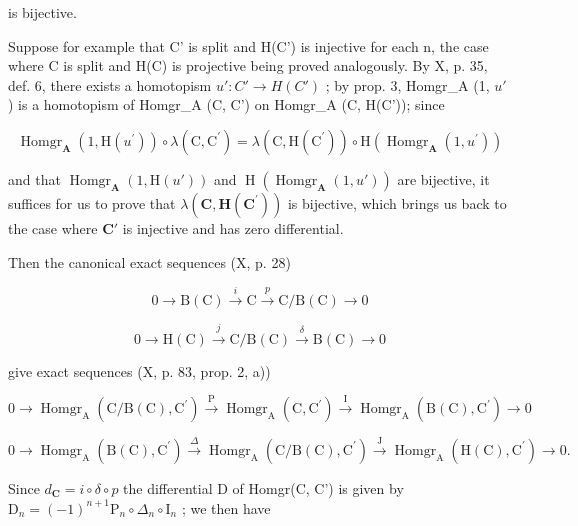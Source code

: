 is bijective.

Suppose for example that C' is split and H(C') is injective for each n, the case where C is split and H(C) is projective being proved analogously. By X, p. 35, def. 6, there exists a homotopism \(u': C' \to H(C')\) ; by prop. 3, Homgr\_A (1, \(u'\) ) is a homotopism of Homgr\_A (C, C') on Homgr\_A (C, H(C')); since

\[
\operatorname{Homgr} _ {\mathbf {A}} \left(1, \mathrm{H} \left(u ^ {\prime}\right)\right) \circ \lambda (\mathrm{C}, \mathrm{C} ^ {\prime}) = \lambda (\mathrm{C}, \mathrm{H} \left(\mathrm{C} ^ {\prime}\right)) \circ \mathrm{H} \left(\operatorname{Homgr} _ {\mathbf {A}} \left(1, u ^ {\prime}\right)\right)
\]

and that \(\operatorname{Homgr}_{\mathbf{A}}(1, \mathrm{H}(u'))\) and \(\operatorname{H}(\operatorname{Homgr}_{\mathbf{A}}(1, u'))\) are bijective, it suffices for us to prove that \(\lambda(\mathbf{C},\mathbf{H}(\mathbf{C}^{\prime}))\) is bijective, which brings us back to the case where \(\mathbf{C}'\) is injective and has zero differential.

Then the canonical exact sequences (X, p. 28)

\[
0 \rightarrow \mathrm{B} (\mathrm{C}) \xrightarrow {i} \mathrm{C} \xrightarrow {p} \mathrm{C} / \mathrm{B} (\mathrm{C}) \rightarrow 0\tag{III}
\]

\[
0 \rightarrow \mathrm{H} (\mathrm{C}) \stackrel {{j}} {{\rightarrow}} \mathrm{C} / \mathrm{B} (\mathrm{C}) \stackrel {{\delta}} {{\rightarrow}} \mathrm{B} (\mathrm{C}) \rightarrow 0\tag{IV}
\]

give exact sequences (X, p. 83, prop. 2, a))

\[
0 \rightarrow \operatorname{Homgr} _ {\mathrm{A}} (\mathrm{C} / \mathrm{B} (\mathrm{C}), \mathrm{C} ^ {\prime}) \xrightarrow {\mathrm{P}} \operatorname{Homgr} _ {\mathrm{A}} (\mathrm{C}, \mathrm{C} ^ {\prime}) \xrightarrow {\mathrm{I}} \operatorname{Homgr} _ {\mathrm{A}} (\mathrm{B} (\mathrm{C}), \mathrm{C} ^ {\prime}) \rightarrow 0
\]

\[
0 \rightarrow \operatorname{Homgr} _ {\mathrm{A}} (\mathrm{B} (\mathrm{C}), \mathrm{C} ^ {\prime}) \stackrel {{\Delta}} {{\rightarrow}} \operatorname{Homgr} _ {\mathrm{A}} (\mathrm{C} / \mathrm{B} (\mathrm{C}), \mathrm{C} ^ {\prime}) \stackrel {{\mathrm{J}}} {{\rightarrow}} \operatorname{Homgr} _ {\mathrm{A}} (\mathrm{H} (\mathrm{C}), \mathrm{C} ^ {\prime}) \rightarrow 0.
\]

Since \(d_{\mathbf{C}} = i \circ \delta \circ p\) the differential D of Homgr(C, C') is given by \(\mathrm{D}_{n} = (-1)^{n+1} \mathrm{P}_{n} \circ \Delta_{n} \circ \mathrm{I}_{n}\) ; we then have

